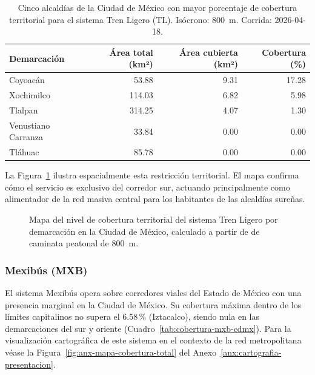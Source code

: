 \begin{table}[H]
    \centering
    \caption[Alcaldías con mayor cobertura de Tren Ligero (CDMX)]{
    Cinco alcaldías de la Ciudad de México con mayor porcentaje de cobertura
    territorial para el sistema Tren Ligero (TL). Isócrono: 800~m.
    Corrida: 2026-04-18.}
    \label{tab:cobertura-tl-cdmx}
    \begin{tabular}{|l|r|r|r|}
        \hline
        \textbf{Demarcación} & \textbf{Área total (km²)} & \textbf{Área cubierta (km²)} & \textbf{Cobertura (\%)} \\
        \hline
        Coyoacán            &  53.88 & 9.31 &  17.28 \\
        Xochimilco          & 114.03 & 6.82 &   5.98 \\
        Tlalpan             & 314.25 & 4.07 &   1.30 \\
        Venustiano Carranza &  33.84 & 0.00 &   0.00 \\
        Tláhuac             &  85.78 & 0.00 &   0.00 \\
        \hline
    \end{tabular}
\end{table}

La Figura~\ref{fig:mapa-cobertura-tl} ilustra espacialmente esta restricción
territorial. El mapa confirma cómo el servicio es exclusivo del corredor sur,
actuando principalmente como alimentador de la red masiva central para los
habitantes de las alcaldías sureñas.

\begin{figure}[H]
    \centering
    \caption[Mapa de cobertura territorial del Tren Ligero en la CDMX]{Mapa del
    nivel de cobertura territorial del sistema Tren Ligero por demarcación en
    la Ciudad de México, calculado a partir de  de caminata
    peatonal de 800~m.}
    \label{fig:mapa-cobertura-tl}
\end{figure}

\subsubsection{Mexibús (MXB)}
\label{subsubsec:cobertura-mxb}

El sistema Mexibús opera sobre corredores viales del Estado de México con una
presencia marginal en la Ciudad de México. Su cobertura máxima dentro de los
límites capitalinos no supera el 6.58\,\% (Iztacalco), siendo nula en las
demarcaciones del sur y oriente (Cuadro~\ref{tab:cobertura-mxb-cdmx}). Para
la visualización cartográfica de este sistema en el contexto de la red
metropolitana véase la Figura~\ref{fig:anx-mapa-cobertura-total} del
Anexo~\ref{anx:cartografia-presentacion}.

